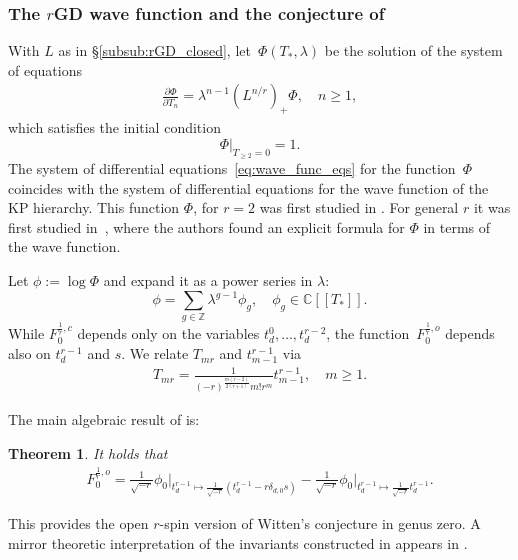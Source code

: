 \documentclass[11pt]{amsart}
\newtheorem{thm}[dummy]{Theorem}
\theoremstyle{definition}
\theoremstyle{remark}
\newcommand{\<}{\left<}
\renewcommand{\>}{\right>}
\numberwithin{equation}{section}
\def\C{{\mathbb C}}
\begin{document}
\subsubsection{The $r$GD wave function and the conjecture of \cite{BCT3}}
With $L$ as in \S \ref{subsub:rGD_closed}, let~$\Phi(T_*,\lambda)$ be the solution of the system of %
equations
\begin{gather}\label{eq:wave_func_eqs}
\frac{\partial\Phi}{\partial T_n}=\lambda^{n-1}(L^{n/r})_+\Phi,\quad n\geq 1,
\end{gather}
which %
satisfies the initial condition
$$
\left.\Phi\right|_{T_{\geq 2}=0}=1.
$$
The system of differential equations~\eqref{eq:wave_func_eqs} for the function~$\Phi$ coincides with the system of differential equations for the wave function of the KP hierarchy.
This function $\Phi$, for $r=2$ was first studied in \cite{Bur16}. For general $r$ it was first studied in~\cite{BY15}, where the authors found an explicit formula for $\Phi$ in terms of the wave function.



Let $\phi:=\log\Phi$ and expand it as a power %
series in $\lambda:$
$$
\phi=\sum_{g\in\mathbb{Z}}\lambda^{g-1}\phi_g,\quad \phi_g\in\C[[T_*]].
$$
While $F^{\frac{1}{r},c}_0$ depends %
only on the variables $t^0_d,\ldots,t^{r-2}_d$, the function~$F^{\frac{1}{r},o}_0$ depends also on $t^{r-1}_d$ and $s$. We relate $T_{mr}$ and $t^{r-1}_{m-1}$ via
\begin{gather}\label{eq:r-1_coord_change}
T_{mr}=\frac{1}{(-r)^{\frac{m(r-2)}{2(r+1)}}m!r^m}t^{r-1}_{m-1},\quad m\ge 1.
\end{gather}

The main algebraic result of \cite{BCT2} is:

\begin{thm}\label{thm:main_BCT2}
It holds that
\begin{gather}\label{eq:main_res_BCT}
F^{\frac{1}{r},o}_0=\frac{1}{\sqrt{-r}}\phi_0\big|_{t^{r-1}_d\mapsto \frac{1}{\sqrt{-r}}(t^{r-1}_d-r\delta_{d,0}s)}-\frac{1}{\sqrt{-r}}\phi_0\big|_{t^{r-1}_d\mapsto\frac{1}{\sqrt{-r}}t^{r-1}_d}.
\end{gather}
\end{thm}
\noindent This provides the open $r$-spin version of Witten's conjecture in genus zero. A mirror theoretic interpretation of the invariants constructed in \cite{BCT2} appears %
in \cite{GKT}.
\end{document}

